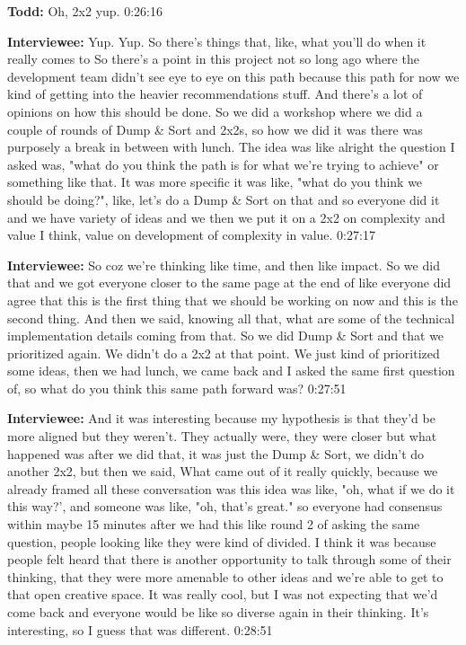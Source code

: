 \textbf{Todd:}  Oh, 2x2 yup.   0:26:16

\textbf{Interviewee:} Yup. Yup. So there's things that, like, what you'll do when it really comes to   So there's a point in this project not so long ago where the development team didn't see eye to eye on this path because this path for now we kind of getting into the heavier recommendations stuff.  And there's a lot of opinions on how this should be done.  So we did a workshop where we did a couple of rounds of Dump \& Sort and 2x2s, so how we did it was there was purposely a break in between with lunch.  The idea was like alright the question I asked was, "what do you think the path is for what we're trying to achieve" or something like that.  It was more specific it was like, "what do you think we should be doing?", like, let's do a Dump \& Sort on that and so everyone did it and we have variety of ideas and we then we put it on a 2x2 on complexity and value I think, value on development of complexity in value.  0:27:17

\textbf{Interviewee:} So coz we're thinking like time, and then like impact. So we did that and we got everyone closer to the same page at the end of like everyone did agree that this is the first thing that we should be working on now and this is the second thing.  And then we said,  knowing all that, what are some of the technical implementation details coming from that.  So we did Dump & Sort and that we prioritized again.  We didn't do a 2x2 at that point.  We just kind of prioritized some ideas, then we had lunch, we came back and I asked the same first question of, so what do you think this same path forward was?  0:27:51

\textbf{Interviewee:} And it was interesting because my hypothesis is that they'd be more aligned but they weren't. They actually were, they were closer but what happened was after we did that, it was just the Dump \& Sort, we didn't do another 2x2, but then we said,  What came out of it really quickly, because we already framed all these conversation was this idea was like, "oh, what if we do it this way?', and someone was like, "oh, that's great." so everyone had consensus within maybe 15 minutes after we had this like round 2 of asking the same question, people looking like they were kind of divided.  I think it was because people felt heard that there is another opportunity to talk through some of their thinking, that they were more amenable to other ideas and we're able to get to that open creative space.  It was really cool, but I was not expecting that we'd come back and everyone would be like so diverse again in their thinking.  It's interesting, so I guess that was different.   0:28:51

